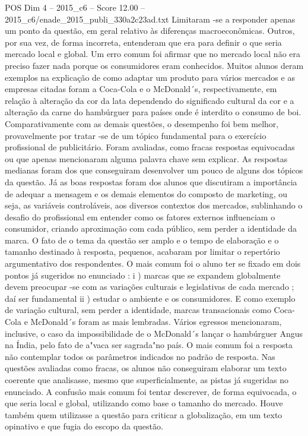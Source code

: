 \begin{textsample}{POS Dim 4 – 2015\_c6 – Score 12.00 – 2015\_c6/enade\_2015\_publi\_330a2c23ad.txt}
Limitaram -se a responder apenas um ponto da questão, em geral relativo às diferenças macroeconômicas.
Outros, por sua vez, de forma incorreta, entenderam que era para definir o que seria mercado local e global.
Um erro comum foi afirmar que no mercado local não era preciso fazer nada porque os consumidores eram conhecidos.
Muitos alunos deram exemplos na explicação de como adaptar um produto para vários mercados e as empresas citadas foram a Coca-Cola e o McDonald´s, respectivamente, em relação à alteração da cor da lata dependendo do significado cultural da cor e a alteração da carne do hambúrguer para países onde é interdito o consumo de boi.
Comparativamente com as demais questões, o desempenho foi bem melhor, provavelmente por tratar -se de um tópico fundamental para o exercício profissional de publicitário.
Foram avaliadas, como fracas respostas equivocadas ou que apenas mencionaram alguma palavra chave sem explicar.
As respostas medianas foram dos que conseguiram desenvolver um pouco de alguns dos tópicos da questão.
Já as boas respostas foram dos alunos que discutiram a importância de adequar a mensagem e os demais elementos do composto de marketing, ou seja, as variáveis controláveis, aos diversos contextos dos mercados, sublinhando o desafio do profissional em entender como os fatores externos influenciam o consumidor, criando aproximação com cada público, sem perder a identidade da marca.
O fato de o tema da questão ser amplo e o tempo de elaboração e o tamanho destinado à resposta, pequenos, acabaram por limitar o repertório argumentativo dos respondentes.
O mais comum foi o aluno ter se fixado em dois pontos já sugeridos no enunciado : i ) marcas que se expandem globalmente devem preocupar -se com as variações culturais e legislativas de cada mercado ; daí ser fundamental ii ) estudar o ambiente e os consumidores.
E como exemplo de variação cultural, sem perder a identidade, marcas transacionais como Coca-Cola e McDonald´s foram as mais lembradas.
Vários egressos mencionaram, inclusive, o caso da impossibilidade de o McDonald´s lançar o hambúrguer Angus na Índia, pelo fato de a"vaca ser sagrada"no país.
O mais comum foi a resposta não contemplar todos os parâmetros indicados no padrão de resposta.
Nas questões avaliadas como fracas, os alunos não conseguiram elaborar um texto coerente que analisasse, mesmo que superficialmente, as pistas já sugeridas no enunciado.
A confusão mais comum foi tentar descrever, de forma equivocada, o que seria local e global, utilizando como base o tamanho do mercado.
Houve também quem utilizasse a questão para criticar a globalização, em um texto opinativo e que fugia do escopo da questão.

\end{textsample}
